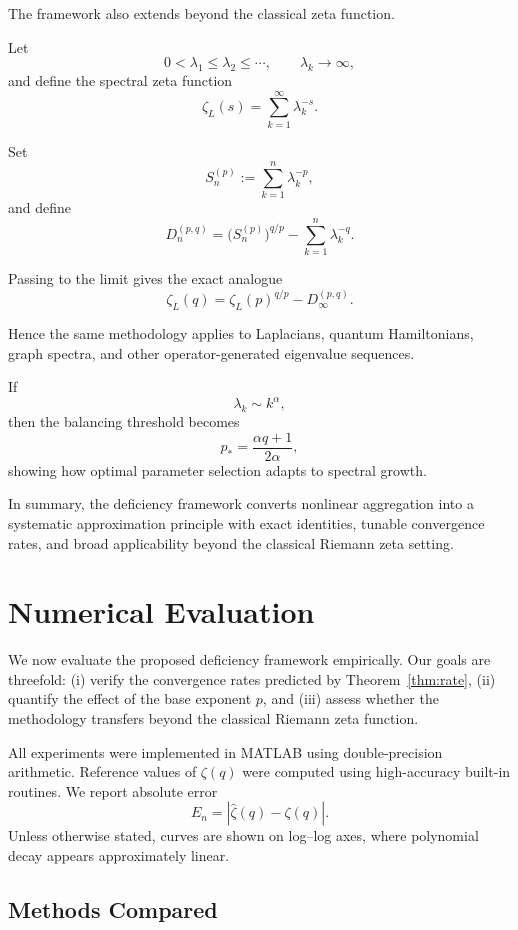 \documentclass[11pt]{article}
\numberwithin{equation}{section}
\theoremstyle{definition}
\begin{document}
The framework also extends beyond the classical zeta function.

Let
\[
0<\lambda_1\le\lambda_2\le\cdots,\qquad \lambda_k\to\infty,
\]
and define the spectral zeta function
\[
\zeta_L(s)=\sum_{k=1}^{\infty}\lambda_k^{-s}.
\]

Set
\[
S_n^{(p)}:=\sum_{k=1}^{n}\lambda_k^{-p},
\]
and define
\[
D_n^{(p,q)}
=
\bigl(S_n^{(p)}\bigr)^{q/p}
-
\sum_{k=1}^{n}\lambda_k^{-q}.
\]

Passing to the limit gives the exact analogue
\[
\boxed{
\zeta_L(q)=\zeta_L(p)^{q/p}-D_\infty^{(p,q)}.
}
\]

Hence the same methodology applies to Laplacians, quantum Hamiltonians, graph spectra, and other operator-generated eigenvalue sequences.

If
\[
\lambda_k\sim k^\alpha,
\]
then the balancing threshold becomes
\[
p_*=\frac{\alpha q+1}{2\alpha},
\]
showing how optimal parameter selection adapts to spectral growth.

In summary, the deficiency framework converts nonlinear aggregation into a systematic approximation principle with exact identities, tunable convergence rates, and broad applicability beyond the classical Riemann zeta setting.



\section{Numerical Evaluation}
\label{sec:evaluation}

We now evaluate the proposed deficiency framework empirically. Our goals are threefold: (i) verify the convergence rates predicted by Theorem~\ref{thm:rate}, (ii) quantify the effect of the base exponent \(p\), and (iii) assess whether the methodology transfers beyond the classical Riemann zeta function.

All experiments were implemented in MATLAB using double-precision arithmetic. Reference values of \(\zeta(q)\) were computed using high-accuracy built-in routines. We report absolute error
\[
E_n=\left|\widehat{\zeta}(q)-\zeta(q)\right|.
\]
Unless otherwise stated, curves are shown on log--log axes, where polynomial decay appears approximately linear.

\subsection{Methods Compared}
\end{document}
